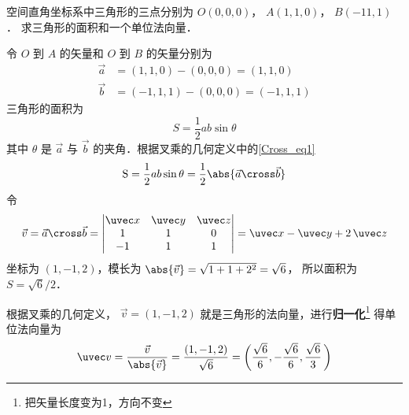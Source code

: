 \begin{exam}{}
空间直角坐标系中三角形的三点分别为 $O(0,0,0)$，  $A(1,1,0)$，  $B(-11,1)$． 求三角形的面积和一个单位法向量．

令 $O$ 到 $A$ 的矢量和  $O$ 到 $B$ 的矢量分别为
\begin{equation}\begin{aligned}
\vec a  &= (1,1,0) - (0,0,0) = (1,1,0)\\
\vec b  &= (-1,1,1) - (0,0,0) = (-1,1,1)
\end{aligned}\end{equation}
三角形的面积为
 \begin{equation}
{{S}} = \frac12 ab \sin \theta 
\end{equation}
其中 $\theta $ 是 $\vec a$ 与 $\vec b$ 的夹角．根据叉乘的几何定义中的\autoref{Cross_eq1}
\begin{equation}
{\rm{S}} = \frac 12 ab \sin \theta  = \frac 12 \abs{\vec a\cross\vec b}
\end{equation}
令
\begin{equation}
\vec v = \vec a \cross \vec b = 
\begin{vmatrix} {\uvec x}&{\uvec y}&{\uvec z}\\ 1&1&0\\-1&1&1 \end{vmatrix}
= \uvec x - \uvec y + 2\,\uvec z 
\end{equation}
坐标为 $(1,-1,2)$，模长为 $\abs{\vec v} = \sqrt {1 + 1 + {2^2}} = \sqrt 6$， 所以面积为 $S = \sqrt 6 /2$． 

根据叉乘的几何定义， $\vec v = (1,-1,2)$ 就是三角形的法向量，进行\textbf{归一化}\footnote{把矢量长度变为1，方向不变}
得单位法向量为
 \begin{equation}
\uvec v = \frac{\vec v}{\abs{\vec v}} = \frac{(1,-1,2)}{\sqrt 6 } = \left( \frac{\sqrt 6 }{6}, - \frac{\sqrt 6 }{6}, \frac{\sqrt 6 }{3} \,\right)
\end{equation}
\end{exam}



